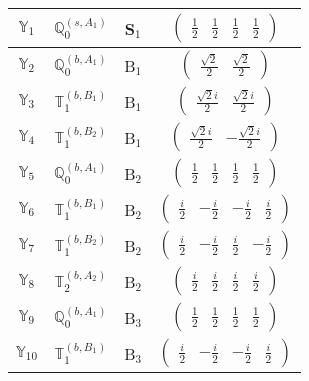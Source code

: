 \documentclass[fleqn,10pt,landscape]{article}
\begin{document}
\begin{itemize}
\begin{center}
\begin{longtable}{c|c|c|c}
$ \mathbb{Y}_{1} $ & $\mathbb{Q}_{0}^{(s,A_{1})}$ & S$_{1}$ & $\begin{pmatrix} \frac{1}{2} & \frac{1}{2} & \frac{1}{2} & \frac{1}{2} \end{pmatrix}$ \\ \hline
$ \mathbb{Y}_{2} $ & $\mathbb{Q}_{0}^{(b,A_{1})}$ & B$_{1}$ & $\begin{pmatrix} \frac{\sqrt{2}}{2} & \frac{\sqrt{2}}{2} \end{pmatrix}$ \\
$ \mathbb{Y}_{3} $ & $\mathbb{T}_{1}^{(b,B_{1})}$ & B$_{1}$ & $\begin{pmatrix} \frac{\sqrt{2} i}{2} & \frac{\sqrt{2} i}{2} \end{pmatrix}$ \\
$ \mathbb{Y}_{4} $ & $\mathbb{T}_{1}^{(b,B_{2})}$ & B$_{1}$ & $\begin{pmatrix} \frac{\sqrt{2} i}{2} & - \frac{\sqrt{2} i}{2} \end{pmatrix}$ \\ \hline
$ \mathbb{Y}_{5} $ & $\mathbb{Q}_{0}^{(b,A_{1})}$ & B$_{2}$ & $\begin{pmatrix} \frac{1}{2} & \frac{1}{2} & \frac{1}{2} & \frac{1}{2} \end{pmatrix}$ \\
$ \mathbb{Y}_{6} $ & $\mathbb{T}_{1}^{(b,B_{1})}$ & B$_{2}$ & $\begin{pmatrix} \frac{i}{2} & - \frac{i}{2} & - \frac{i}{2} & \frac{i}{2} \end{pmatrix}$ \\
$ \mathbb{Y}_{7} $ & $\mathbb{T}_{1}^{(b,B_{2})}$ & B$_{2}$ & $\begin{pmatrix} \frac{i}{2} & - \frac{i}{2} & \frac{i}{2} & - \frac{i}{2} \end{pmatrix}$ \\
$ \mathbb{Y}_{8} $ & $\mathbb{T}_{2}^{(b,A_{2})}$ & B$_{2}$ & $\begin{pmatrix} \frac{i}{2} & \frac{i}{2} & \frac{i}{2} & \frac{i}{2} \end{pmatrix}$ \\ \hline
$ \mathbb{Y}_{9} $ & $\mathbb{Q}_{0}^{(b,A_{1})}$ & B$_{3}$ & $\begin{pmatrix} \frac{1}{2} & \frac{1}{2} & \frac{1}{2} & \frac{1}{2} \end{pmatrix}$ \\
$ \mathbb{Y}_{10} $ & $\mathbb{T}_{1}^{(b,B_{1})}$ & B$_{3}$ & $\begin{pmatrix} \frac{i}{2} & - \frac{i}{2} & - \frac{i}{2} & \frac{i}{2} \end{pmatrix}$ \\

\end{longtable}
\end{center}
\end{itemize}
\end{document}
